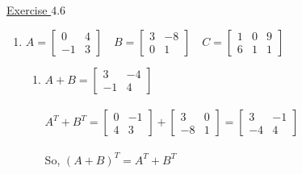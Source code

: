 \underline{Exercise $4.6$}
\begin{enumerate}
\item[2.] $
A=\left[\begin{array}{cc}
0 & 4 \\
-1 & 3
\end{array}\right] \quad B=\left[\begin{array}{cc}
3 & -8 \\
0 & 1
\end{array}\right] \quad C=\left[\begin{array}{lll}
1 & 0 & 9 \\
6 & 1 & 1
\end{array}\right]
$

\begin{enumerate}

\item[(a)] \( A+B=\left[\begin{array}{cc}3 & -4 \\ -1 & 4\end{array}\right] \) \\~\\
\( A^T+B^T=\left[\begin{array}{rr}0 & -1 \\ 4 & 3\end{array}\right]+\left[\begin{array}{cc}3 & 0 \\ -8 & 1\end{array}\right]=\left[\begin{array}{cc}3 & -1 \\ -4 & 4\end{array}\right] \) \\~\\
So, \((A+B)^T=A^T+B^T\) \\


\end{enumerate}
\end{enumerate}

